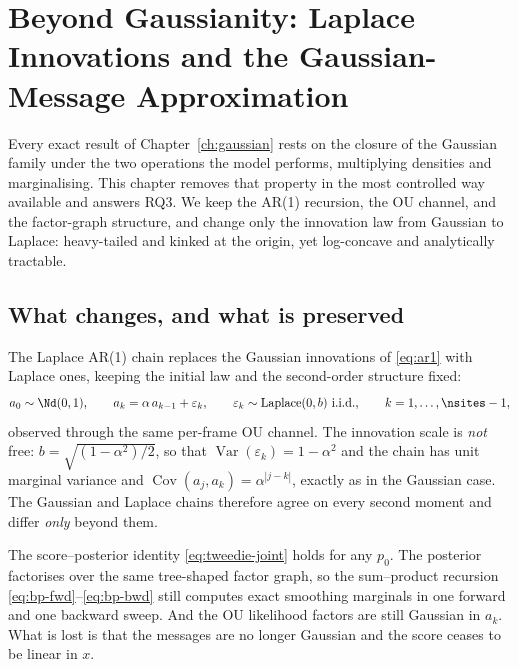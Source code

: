 \chapter{Beyond Gaussianity: Laplace Innovations and the Gaussian-Message
Approximation}\label{ch:laplace}\label{sec:bp-nongaussian}

Every exact result of Chapter~\ref{ch:gaussian} rests on the closure of
the Gaussian family under the two operations the model performs,
multiplying densities and marginalising. This chapter removes that
property in the most controlled way available and answers RQ3. We keep
the AR(1) recursion, the OU channel, and the factor-graph structure, and
change only the innovation law from Gaussian to Laplace: heavy-tailed and
kinked at the origin, yet log-concave and analytically tractable.

\section{What changes, and what is preserved}\label{sec:l-model}

The Laplace AR(1) chain replaces the Gaussian innovations of
\eqref{eq:ar1} with Laplace ones, keeping the initial law and the
second-order structure fixed:
\begin{equation}
  a_0 \sim \Nd(0,1), \qquad
  a_k = \alpha\, a_{k-1} + \varepsilon_k, \qquad
  \varepsilon_k \sim \mathrm{Laplace}(0, b) \ \text{i.i.d.}, \qquad
  k = 1,\dots,\nsites-1 ,
  \label{eq:l-chain-prior}
\end{equation}
observed through the same per-frame OU channel. The innovation scale is
\emph{not} free: $b = \sqrt{(1-\alpha^2)/2}$, so that
$\operatorname{Var}(\varepsilon_k) = 1-\alpha^2$ and the chain has unit
marginal variance and $\operatorname{Cov}(a_j,a_k)=\alpha^{|j-k|}$, exactly
as in the Gaussian case. The Gaussian and Laplace chains therefore agree on
every second moment and differ \emph{only} beyond them.

The score--posterior
identity \eqref{eq:tweedie-joint} holds for any $p_0$. The posterior
factorises over the same tree-shaped factor graph, so the sum--product recursion
\eqref{eq:bp-fwd}--\eqref{eq:bp-bwd} still computes exact smoothing marginals
in one forward and one backward sweep. And the OU likelihood factors are still
Gaussian in $a_k$. What is lost is that the messages are no longer
Gaussian
and the score ceases to be linear in $x$.

